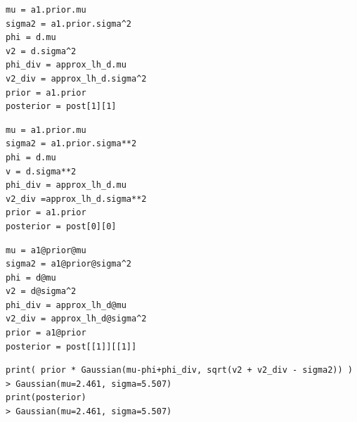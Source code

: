\documentclass[a4paper,10pt]{book}
\theoremstyle{definition}
\newif\ifen
\newif\ifes
\newcommand{\en}[1]{\ifen#1\fi}
\newcommand{\es}[1]{\ifes#1\fi}
\begin{document}
%
\begin{lstlisting}[backgroundcolor=\color{white}, label=lst:posterior_s1_approx, caption={\en{Accessing the approximate posterior}\es{Accediendo al posterior aproximado}}, belowskip=-1.0 \baselineskip, aboveskip=-0 \baselineskip]
\end{lstlisting}
\begin{paracol}{3}
\begin{lstlisting}[backgroundcolor=\color{julia!60},belowskip=-0.77 \baselineskip]
mu = a1.prior.mu
sigma2 = a1.prior.sigma^2
phi = d.mu
v2 = d.sigma^2
phi_div = approx_lh_d.mu
v2_div = approx_lh_d.sigma^2
prior = a1.prior
posterior = post[1][1]
\end{lstlisting}
\switchcolumn
\begin{lstlisting}[backgroundcolor=\color{python!60},belowskip=-0.77 \baselineskip]
mu = a1.prior.mu
sigma2 = a1.prior.sigma**2
phi = d.mu
v = d.sigma**2
phi_div = approx_lh_d.mu
v2_div =approx_lh_d.sigma**2
prior = a1.prior
posterior = post[0][0]
\end{lstlisting}
\switchcolumn
\begin{lstlisting}[backgroundcolor=\color{r!50},belowskip=-0.77 \baselineskip]
mu = a1@prior@mu
sigma2 = a1@prior@sigma^2
phi = d@mu
v2 = d@sigma^2
phi_div = approx_lh_d@mu
v2_div = approx_lh_d@sigma^2
prior = a1@prior
posterior = post[[1]][[1]]
\end{lstlisting}
\end{paracol}
\begin{lstlisting}[backgroundcolor=\color{all},belowskip=0.0 \baselineskip]
print( prior * Gaussian(mu-phi+phi_div, sqrt(v2 + v2_div - sigma2)) )
> Gaussian(mu=2.461, sigma=5.507)
print(posterior)
> Gaussian(mu=2.461, sigma=5.507)
\end{lstlisting}
%
\en{with \texttt{a1}, \texttt{d}, and \texttt{approx\_lh\_d} computed in codes \ref{lst:player}, \ref{lst:difference_performance}, and \ref{lst:d_div}. }%
\es{con \texttt{a1}, \texttt{d} y \texttt{approx\_lh\_d} computadas en los códigos \ref{lst:player}, \ref{lst:difference_performance} y \ref{lst:d_div}. }%
%
\en{The obtained posterior is the same as the one returned by the \texttt{Gaussian} class. }%
\es{Se puede ver que el posterior que nosotros hemos computado es el mismo que devuelve la clase \texttt{Gaussian}. }%

\subsection{\en{Multiple Teams}} \label{sec:iterative_posterior} 
\end{document}
